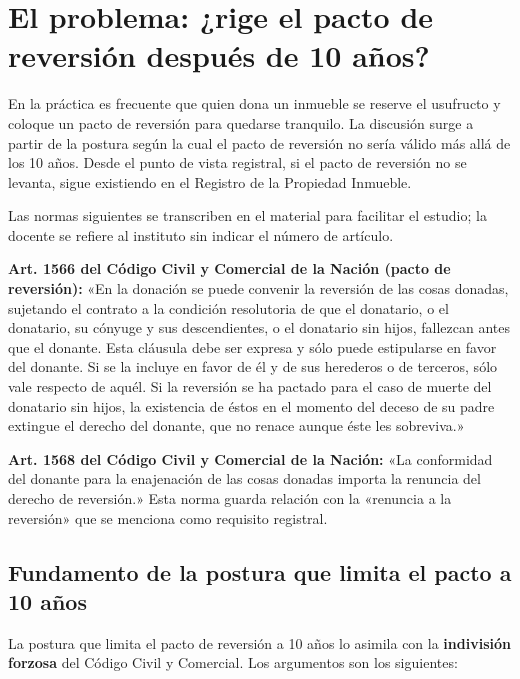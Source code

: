 \documentclass[12pt,oneside]{book}
\begin{document}
\section{El problema: ¿rige el pacto de reversión después de 10 años?}

En la práctica es frecuente que quien dona un inmueble se reserve el usufructo y coloque un pacto de reversión para quedarse tranquilo. La discusión surge a partir de la postura según la cual el pacto de reversión no sería válido más allá de los 10 años. Desde el punto de vista registral, si el pacto de reversión no se levanta, sigue existiendo en el Registro de la Propiedad Inmueble.

\begin{note}
Las normas siguientes se transcriben en el material para facilitar el estudio; la docente se refiere al instituto sin indicar el número de artículo.

\textbf{Art. 1566 del Código Civil y Comercial de la Nación (pacto de reversión):} «En la donación se puede convenir la reversión de las cosas donadas, sujetando el contrato a la condición resolutoria de que el donatario, o el donatario, su cónyuge y sus descendientes, o el donatario sin hijos, fallezcan antes que el donante. Esta cláusula debe ser expresa y sólo puede estipularse en favor del donante. Si se la incluye en favor de él y de sus herederos o de terceros, sólo vale respecto de aquél. Si la reversión se ha pactado para el caso de muerte del donatario sin hijos, la existencia de éstos en el momento del deceso de su padre extingue el derecho del donante, que no renace aunque éste les sobreviva.»

\textbf{Art. 1568 del Código Civil y Comercial de la Nación:} «La conformidad del donante para la enajenación de las cosas donadas importa la renuncia del derecho de reversión.» Esta norma guarda relación con la «renuncia a la reversión» que se menciona como requisito registral.
\end{note}

\subsection{Fundamento de la postura que limita el pacto a 10 años}

La postura que limita el pacto de reversión a 10 años lo asimila con la \textbf{indivisión forzosa} del Código Civil y Comercial. Los argumentos son los siguientes:
\end{document}
